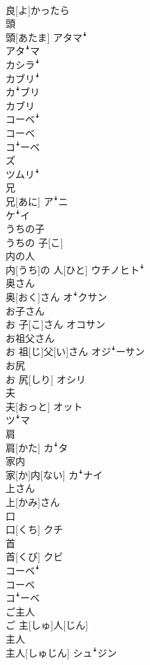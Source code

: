 \documentclass[8pt]{extreport}
\begin{document}
\begin{CJK}{UTF8}{min}
\\	良[よ]かったら	
\\	頭	
\\	頭[あたま]	アタマꜜ 
\\	アタꜜマ 
\\	カシラꜜ 
\\	カブリꜜ 
\\	カꜜブリ 
\\	カブリ 
\\	コーベꜜ 
\\	コーベ 
\\	コꜜーベ 
\\	ズ 
\\	ツムリꜜ
\\	兄	
\\	兄[あに]	アꜜニ 
\\	ケꜜイ
\\	うちの子	
\\	うちの 子[こ]	
\\	内の人	
\\	内[うち]の 人[ひと]	ウチノヒトꜜ
\\	奥さん	
\\	奥[おく]さん	オꜜクサン
\\	お子さん	
\\	お 子[こ]さん	オコサン
\\	お祖父さん	
\\	お 祖[じ]父[い]さん	オジꜜーサン
\\	お尻	
\\	お 尻[しり]	オシリ
\\	夫	
\\	夫[おっと]	オット 
\\	ツꜜマ
\\	肩	
\\	肩[かた]	カꜜタ
\\	家内	
\\	家[か]内[ない]	カꜜナイ
\\	上さん	
\\	上[かみ]さん	
\\	口	
\\	口[くち]	クチ
\\	首	
\\	首[くび]	クビ 
\\	コーベꜜ 
\\	コーベ 
\\	コꜜーベ
\\	ご主人	
\\	ご 主[しゅ]人[じん]	
\\	主人	
\\	主人[しゅじん]	シュꜜジン

\end{CJK}
\end{document}
